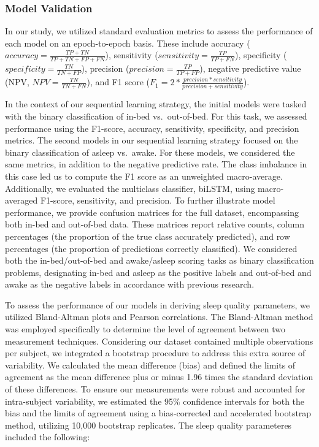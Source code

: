 \documentclass[
  super,
  preprint,
  3p]{elsarticle}
\begin{document}
\hypertarget{model-validation}{%
\subsubsection{Model Validation}\label{model-validation}}

In our study, we utilized standard evaluation metrics to assess the
performance of each model on an epoch-to-epoch basis. These include
accuracy (\(accuracy = \frac{TP+TN}{TP+TN+FP+FN}\)), sensitivity
(\(sensitivity = \frac{TP}{TP+FN}\)), specificity
(\(specificity = \frac{TN}{TN+FP}\)), precision
(\(precision = \frac{TP}{TP+FP}\)), negative predictive value (NPV,
\(NPV = \frac{TN}{TN + FN}\)), and F1 score
(\(F_1 = 2 * \frac{precision * sensitivity}{precision + sensitivity}\)).

In the context of our sequential learning strategy, the initial models
were tasked with the binary classification of in-bed vs.~out-of-bed. For
this task, we assessed performance using the F1-score, accuracy,
sensitivity, specificity, and precision metrics. The second models in
our sequential learning strategy focused on the binary classification of
asleep vs.~awake. For these models, we considered the same metrics, in
addition to the negative predictive rate. The class imbalance in this
case led us to compute the F1 score as an unweighted macro-average.
Additionally, we evaluated the multiclass classifier, biLSTM, using
macro-averaged F1-score, sensitivity, and precision. To further
illustrate model performance, we provide confusion matrices for the full
dataset, encompassing both in-bed and out-of-bed data. These matrices
report relative counts, column percentages (the proportion of the true
class accurately predicted), and row percentages (the proportion of
predictions correctly classified). We considered both the
in-bed/out-of-bed and awake/asleep scoring tasks as binary
classification problems, designating in-bed and asleep as the positive
labels and out-of-bed and awake as the negative labels in accordance
with previous research\citep{hjorth2012, kushida2001}.

To assess the performance of our models in deriving sleep quality
parameters, we utilized Bland-Altman plots and Pearson correlations. The
Bland-Altman method was employed specifically to determine the level of
agreement between two measurement techniques. Considering our dataset
contained multiple observations per subject, we integrated a bootstrap
procedure to address this extra source of variability. We calculated the
mean difference (bias) and defined the limits of agreement as the mean
difference plus or minus 1.96 times the standard deviation of these
differences. To ensure our measurements were robust and accounted for
intra-subject variability, we estimated the 95\% confidence intervals
for both the bias and the limits of agreement using a bias-corrected and
accelerated bootstrap method, utilizing 10,000 bootstrap replicates. The
sleep quality parameteres included the following:
\end{document}
